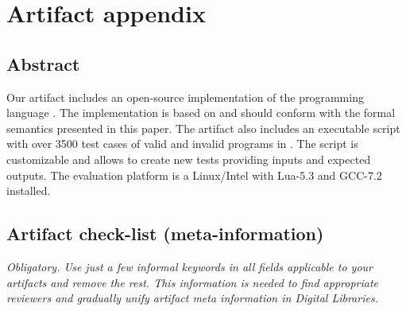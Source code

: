 \appendix
\section{Artifact appendix}


\subsection{Abstract}

Our artifact includes an open-source implementation of the programming language
\CEU.
The implementation is based on and should conform with the formal semantics
presented in this paper.
The artifact also includes an executable script with over 3500 test cases of
valid and invalid programs in \CEU.
The script is customizable and allows to create new tests providing inputs and
expected outputs.
The evaluation platform is a Linux/Intel with Lua-5.3 and GCC-7.2 installed.

\subsection{Artifact check-list (meta-information)}

{\em Obligatory. Use just a few informal keywords in all fields applicable to your artifacts
and remove the rest. This information is needed to find appropriate reviewers and gradually 
unify artifact meta information in Digital Libraries.}

